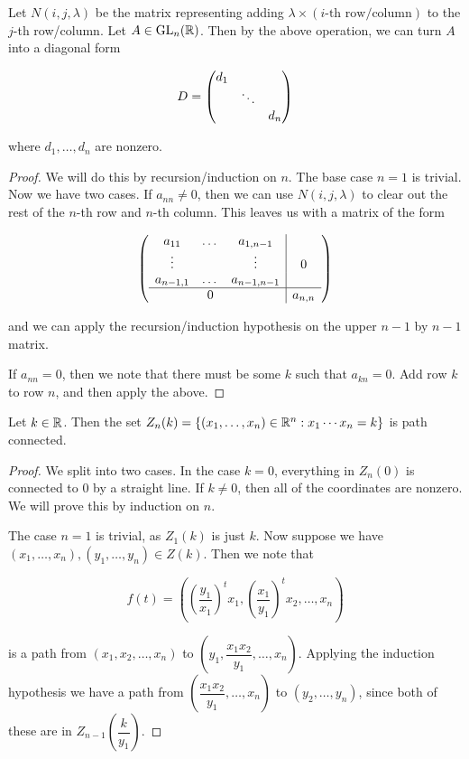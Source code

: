 \documentclass{article}
\begin{document}
    \begin{lemma}
        \label{row_col_add_diag_form}
        Let $N(i, j, \lambda)$ be the matrix representing adding $\lambda \times (i\text{-th row/column})$ to the $j$-th row/column. Let $A \in \operatorname{GL}_n(\mathbb{R})$. Then by the above operation, we can turn $A$ into a diagonal form

        $$D = \mqty(\dmat{d_1,\ddots,d_n})$$

        where $d_1, \dots, d_n$ are nonzero.
    \end{lemma}

    \begin{proof}
        We will do this by recursion/induction on $n$. The base case $n = 1$ is trivial. Now we have two cases. If $a_{nn} \ne 0$, then we can use $N(i, j, \lambda)$ to clear out the rest of the $n$-th row and $n$-th column. This leaves us with a matrix of the form
        
        $$\left(\begin{array}{c c c | c}
            a_{11} & \dots & a_{1, n-1} & \\
            \vdots & & \vdots & 0 \\
            a_{n-1, 1} & \dots & a_{n-1, n-1} &  \\
            \hline
            & 0 & & a_{n, n}
        \end{array}\right)$$

        and we can apply the recursion/induction hypothesis on the upper $n-1$ by $n-1$ matrix.

        If $a_{nn} = 0$, then we note that there must be some $k$ such that $a_{kn} = 0$. Add row $k$ to row $n$, and then apply the above.
    \end{proof}

    \begin{lemma}
        \label{products_set_path_connected}

        Let $k \in \mathbb{R}$. Then the set $Z_n(k) = \{(x_1, \dots, x_n) \in \mathbb{R}^n : x_1\cdots x_n = k\}$ is path connected.
    \end{lemma}

    \begin{proof}
        We split into two cases. In the case $k = 0$, everything in $Z_n(0)$ is connected to $0$ by a straight line. If $k \ne 0$, then all of the coordinates are nonzero. We will prove this by induction on $n$.

        The case $n = 1$ is trivial, as $Z_1(k)$ is just $k$. Now suppose we have $(x_1, \dots, x_n), (y_1, \dots, y_n) \in Z(k)$. Then we note that 
        
        $$f(t) = \left(\left(\frac{y_1}{x_1}\right)^t x_1, \left(\frac{x_1}{y_1}\right)^tx_2, \dots, x_n\right)$$

        is a path from $(x_1, x_2, \dots, x_n)$ to $\left(y_1, \dfrac{x_1x_2}{y_1}, \dots, x_n\right)$. Applying the induction hypothesis we have a path from $\left(\dfrac{x_1x_2}{y_1}, \dots, x_n\right)$ to $(y_2, \dots, y_n)$, since both of these are in $Z_{n-1}\left(\dfrac{k}{y_1}\right)$.
    \end{proof}
\end{document}
